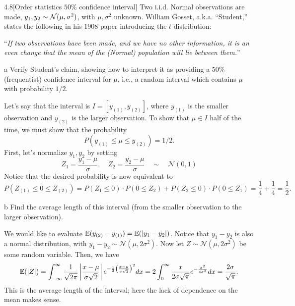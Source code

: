 \documentclass{pset}
\begin{document}
\begin{problem}{4.8}[Order statistics $50\%$ confidence interval]
  Two i.i.d. Normal observations are made, $y_1, y_2\sim \mathcal{N}(\mu, \sigma^2)$, with $\mu, \sigma^2$ unknown. William Gosset, a.k.a. ``Student,'' states the following in his 1908 paper introducing the $t$-distribution:
  \medskip
  \begin{center}
    ``\emph{If two observations have been made, and we have no other information, it is an even change that the mean of the (Normal) population will lie between them.}''
  \end{center}
\end{problem}

\begin{parts}
  \begin{part}{a}
    Verify Student's claim, showing how to interpret it as providing a $50\%$ (frequentist) confidence interval for $\mu$, i.e., a random interval which contains $\mu$ with probability $1/2$.
  \end{part}

  Let's say that the interval is $I=[y_{(1)}, y_{(2)}]$, where $y_{(1)}$ is the smaller observation and $y_{(2)}$ is the larger observation. To show that $\mu\in I$ half of the time, we must show that the probability
  \[
    P(y_{(1)} \leq \mu \leq y_{(2)}) = 1/2.
  \]
  First, let's normalize $y_1, y_2$ by setting
  \[
    Z_1 = \frac{y_1 - \mu}{\sigma}, \quad Z_2 = \frac{y_2 - \mu}{\sigma} \quad \sim \quad \mathcal{N}(0, 1)
  \]
  Notice that the desired probability is now equivalent to 
  \[
    P\left(Z_{(1)} \leq 0 \leq Z_{(2)}\right) = P(Z_1\leq 0)\cdot P(0\leq Z_2) + P(Z_2\leq 0)\cdot P(0\leq Z_1) = \frac{1}{4} + \frac{1}{4} = \frac{1}{2}.
  \]

  \begin{part}{b}
    Find the average length of this interval (from the smaller observation to the larger observation). %
  \end{part}

  We would like to evaluate $\mathbb{E}(y_{(2)} - y_{(1)}) = \mathbb{E}(|y_1 - y_2|)$. Notice that $y_1 - y_2$ is also a normal distribution, with $y_1-y_2\sim \mathcal{N}(\mu, 2\sigma^2)$. Now let $Z\sim \mathcal{N}(\mu, 2\sigma^2)$ be some random variable. Then, we have
  \[
    \mathbb{E}(|Z|) = \int_{-\infty}^\infty \frac{1}{\sqrt{2\pi}}\left|\frac{x-\mu}{\sigma\sqrt{2}}\right|e^{-\frac{1}{2}\left(\frac{x - \mu}{\sigma\sqrt{2}}\right)^2}dx = 2\int_{0}^{\infty}\frac{x}{2\sigma\sqrt{\pi}}e^{-\frac{x^2}{4\sigma^2}}dx = \frac{2\sigma}{\sqrt{\pi}}.
  \]
  This is the average length of the interval; here the lack of dependence on the mean makes sense.
\end{parts}
\end{document}
